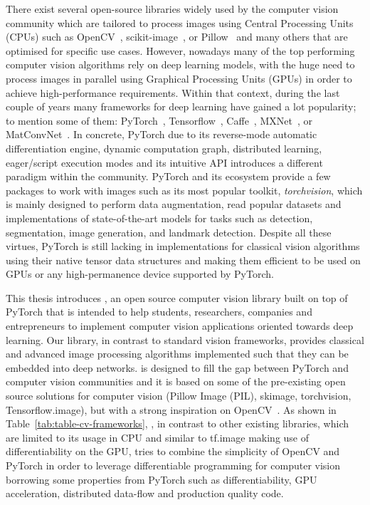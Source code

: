 There exist several open-source libraries widely used by the computer vision community which are tailored to process images using Central Processing Units (CPUs) such as OpenCV~\citep{opencv}, scikit-image~\citep{scikit-image}, or Pillow~\citep{pillow} and many others that are optimised for specific use cases. However, nowadays many of the top performing computer vision algorithms rely on deep learning models, with the huge need to process images in parallel using Graphical Processing Units (GPUs) in order to achieve high-performance requirements. Within that context, during the last couple of years many frameworks for deep learning have gained a lot popularity; to mention some of them: PyTorch~\citep{pytorch}, Tensorflow~\citep{tensorflow2015-whitepaper}, Caffe~\citep{caffe}, MXNet~\citep{journals/corr/ChenLLLWWXXZZ15}, or MatConvNet~\citep{Vedaldi15}. In concrete, PyTorch \citep{pytorch} due to its reverse-mode automatic differentiation engine, dynamic computation graph, distributed learning, eager/script execution modes and its intuitive API introduces a different paradigm within the community. PyTorch and its ecosystem provide a few packages to work with images such as its most popular toolkit, \textit{torchvision}, which is mainly designed to perform data augmentation, read popular datasets and implementations of state-of-the-art models for tasks such as detection, segmentation, image generation, and landmark detection. Despite all these virtues, PyTorch is still lacking in implementations for classical vision algorithms using their native tensor data structures and making them efficient to be used on GPUs or any high-permanence device supported by PyTorch.

This thesis introduces \lib, an open source computer vision library built on top of PyTorch that is intended to help students, researchers, companies and entrepreneurs to implement computer vision applications oriented towards deep learning. Our library, in contrast to standard vision frameworks, provides classical and advanced image processing algorithms implemented such that they can be embedded into deep networks. \lib{} is designed to fill the gap between PyTorch and computer vision communities and it is based on some of the pre-existing open source solutions for computer vision (Pillow Image (PIL), skimage, torchvision, Tensorflow.image), but with a strong inspiration on OpenCV~\citep{opencv}. As shown in Table~\ref{tab:table-cv-frameworks}, \lib{}, in contrast to other existing libraries, which are limited to its usage in CPU and similar to tf.image making use of differentiability on the GPU, tries to combine the simplicity of OpenCV and PyTorch in order to leverage differentiable programming for computer vision  borrowing some properties from PyTorch such as differentiability, GPU acceleration, distributed data-flow and production quality code.

